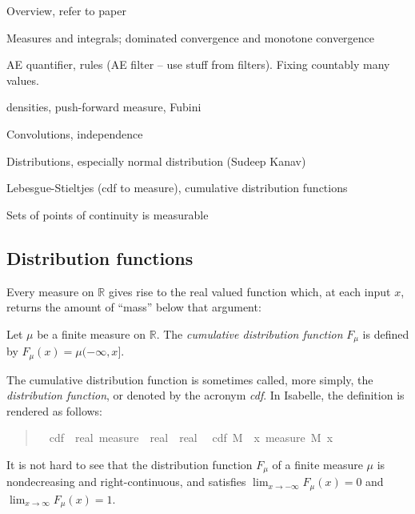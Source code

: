\documentclass{svjour3}
\newcommand{\todo}[1]{{\color{red}#1}}
\newcommand{\RR}{\mathbb{R}}
\begin{document}
\todo{
Overview, refer to paper

Measures and integrals; dominated convergence and monotone convergence

AE quantifier, rules (AE filter -- use stuff from filters). Fixing countably many values.

densities, push-forward measure, Fubini

Convolutions, independence

Distributions, especially normal distribution (Sudeep Kanav)

Lebesgue-Stieltjes (cdf to measure), cumulative distribution functions

Sets of points of continuity is measurable
}

\subsection{Distribution functions}

Every measure on $\RR$ gives rise to the real valued function which, at each input $x$, returns the amount of ``mass'' below that argument:

\begin{definition}
Let $\mu$ be a finite measure on $\RR$. The \emph{cumulative distribution function} $F_\mu$ is defined by $F_\mu(x) = \mu (-\infty, x]$.
\end{definition}

The cumulative distribution function is sometimes called, more simply, the \emph{distribution function}, or denoted by the acronym \emph{cdf}. In Isabelle, the definition is rendered as follows:

\begin{quote}
\begin{isabellebody}
\isamarkupfalse%
\isanewline
\ \ cdf\ {\isacharcolon}{\isacharcolon}\ {\isachardoublequoteopen}real\ measure\ {\isasymRightarrow}\ real\ {\isasymRightarrow}\ real{\isachardoublequoteclose}\isanewline
{}\isanewline
\ \ {\isachardoublequoteopen}cdf\ M\ {\isasymequiv}\ {\isasymlambda}x{\isachardot}\ measure\ M\ {\isacharbraceleft}{\isachardot}{\isachardot}x{\isacharbraceright}{\isachardoublequoteclose}
\end{isabellebody}
\end{quote}

It is not hard to see that the distribution function $F_\mu$ of a finite measure $\mu$ is nondecreasing and right-continuous, and satisfies $\lim_{x \rightarrow -\infty} F_\mu(x) = 0$ and \linebreak $\lim_{x \rightarrow \infty} F_\mu(x) = 1$.
\end{document}

